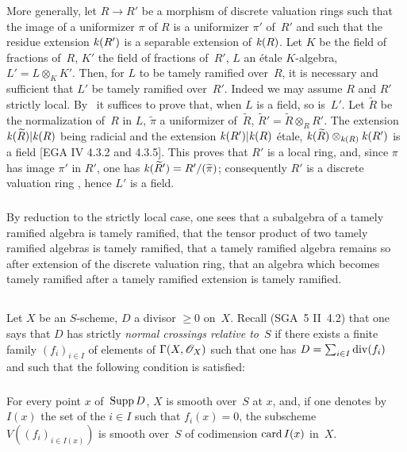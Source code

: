 More generally, let $R \to R'$ be a morphism of discrete
valuation rings such that the image of a uniformizer $\pi$ of
$R$ is a uniformizer $\pi'$ of~$R'$ and such that the residue
extension $\mathit{k}(R')$ is a separable extension of
$\mathit{k}(R)$. Let $K$ be the field of fractions of~$R$, $K'$ the field of
fractions of~$R'$, $L$ an étale $K$-algebra, $L' = L
\otimes_K K'$. Then, for $L$ to be tamely
ramified over~$R$, it is necessary and sufficient that $L'$ be
tamely ramified over~$R'$. Indeed we may assume
$R$ and $R'$ strictly local. By~ it suffices
to prove that, when $L$ is a field, so is~$L'$. Let $\tilde{R}$ be the normalization of~$R$ in $L$,
$\tilde{\pi}$ a uniformizer of~$\tilde{R}$, $\tilde{R}' =
\tilde{R} \otimes_R R'$. The extension $\mathit{k}(\widetilde{R})|\mathit{k}(R)$ being
radicial and the extension $\mathit{k}(R')|\mathit{k}(R)$ étale,
$\mathit{k}(\widetilde{R})\otimes_{\mathit{k}(R)}\mathit{k}(R')$ is a field [EGA IV 4.3.2 and
4.3.5]. This proves that $R'$ is a local ring, and, since $\pi$ has
image $\pi'$ in $R'$, one has $\mathit{k}(\widetilde{R}')= R'/(\widetilde{\pi})$;
consequently $R'$ is a discrete valuation ring \cite[ch\ptbl I \S 2
prop]{XIII.5}, hence $L'$ is a field.

\subsubsection{}
\label{XIII.2.0.3}
By reduction to the strictly local case, one sees that a
subalgebra of a tamely ramified algebra is
tamely ramified, that the tensor product of two
tamely ramified algebras is tamely
ramified, that a tamely ramified algebra remains
so after extension of the discrete valuation ring,
that an algebra which becomes tamely ramified
after a tamely ramified extension is
tamely ramified.

\subsection{}
\label{XIII.2.1}
Let
$X$ be an $S$-scheme, $D$ a divisor $\geq 0$ on~$X$.
Recall (SGA~5 II~4.2) that one says that $D$ has strictly
\emph{normal crossings relative to}~$S$
if there exists a finite family $(f_i)_{i\in I}$ of elements of
$\Gamma(X,\cal{O}_X)$ such that one has $D=\sum_{i\in
I}\operatorname{\mathrm{div}}(f_i)$ and such that the following condition is satisfied:

\setcounter{subsubsection}{-1}
\subsubsection{}
\label{XIII.2.1.0}
For every point $x$ of~$\operatorname{Supp} D$, $X$ is smooth over~$S$ at $x$, and, if
one denotes by $I(x)$ the set of the $i\in I$ such that $f_i(x)=0$, the
subscheme $V((f_i)_{i\in I(x)})$ is smooth over~$S$ of
codimension
$\operatorname{card} I(x)$
in~$X$.

